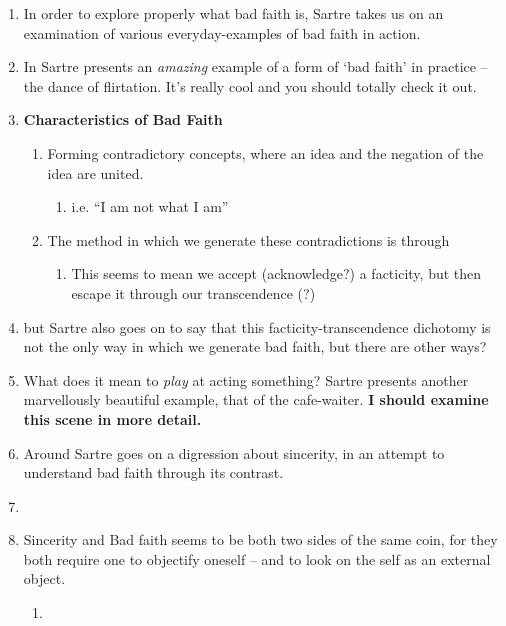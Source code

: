 \begin{enumerate}
  \item In order to explore properly what bad faith is, Sartre takes us on an examination of various everyday-examples of bad faith in action.
  \item In \autocite[98]{sartre} Sartre presents an \emph{amazing} example of a form of `bad faith' in practice -- the dance of flirtation. It's really cool and you should totally check it out.
  \item \textbf{Characteristics of Bad Faith}
  \begin{enumerate}
    \item Forming contradictory concepts, where an idea and the negation of the idea are united.
    \begin{enumerate}
      \item i.e. \enquote{I am not what I am}
    \end{enumerate}
    \item The method in which we generate these contradictions is through 
    \begin{enumerate}
      \item This seems to mean we accept (acknowledge?) a facticity, but then escape it through our transcendence (?)
    \end{enumerate}
  \end{enumerate}
  \item but Sartre also goes on to say that this facticity-transcendence dichotomy is not the only way in which we generate bad faith, but there are other ways?
  \item \autocite[102]{sartre} What does it mean to \emph{play} at acting something? Sartre presents another marvellously beautiful example, that of the cafe-waiter. \textbf{I should examine this scene in more detail.}
  \item Around \autocite[109]{sartre} Sartre goes on a digression about sincerity, in an attempt to understand bad faith through its contrast.
  \item {}
  \item Sincerity and Bad faith seems to be both two sides of the same coin, for they both require one to objectify oneself -- and to look on the self as an external object.
  \begin{enumerate}
    \item {}
  \end{enumerate}
\end{enumerate}

